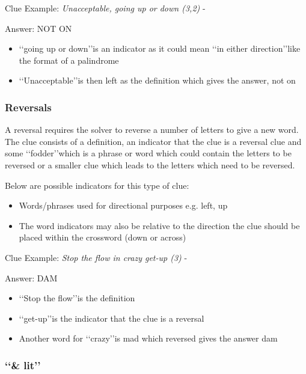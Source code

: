 Clue Example: \emph{Unacceptable, going up or down (3,2)} - \citep{connorPalindromes12} 

Answer: NOT ON 

\begin{itemize}
	\item \lq\lq going up or down\rq\rq is an indicator as it could mean \lq\lq in either direction\rq\rq like the format of a palindrome 
	\item \lq\lq Unacceptable\rq\rq is then left as the definition which gives the answer, not on 
\end{itemize}

\subsubsection{Reversals}

A reversal requires the solver to reverse a number of letters to give a new word. The clue consists of a definition, an indicator that the clue is a reversal clue and some \lq\lq fodder\rq\rq which is a phrase or word which could contain the letters to be reversed or a smaller clue which leads to the letters which need to be reversed.  

Below are possible indicators for this type of clue: 
\begin{itemize}
	\item Words/phrases used for directional purposes e.g. left, up 
	\item The word indicators may also be relative to the direction the clue should be placed within the crossword (down or across) 
\\
\end{itemize}

Clue Example: \emph{Stop the flow in crazy get-up (3)} - \citep{shuchiReversals08}

Answer: DAM 

\begin{itemize}
	\item \lq\lq Stop the flow\rq\rq is the definition 
	\item \lq\lq get-up\rq\rq is the indicator that the clue is a reversal 
	\item Another word for \lq\lq crazy\rq\rq is mad which reversed gives the answer dam 
\end{itemize}

\subsubsection{\lq\lq \& lit\rq\rq}

